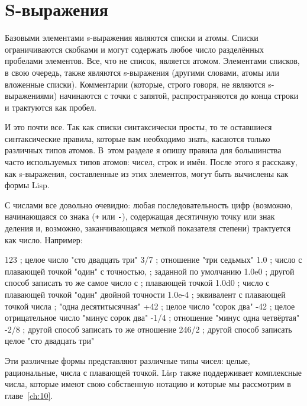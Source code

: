 \section{S-выражения}

Базовыми элементами s-выражения являются списки и атомы. Списки ограничиваются скобками и
могут содержать любое число разделённых пробелами элементов. Все, что не список, является
атомом. Элементами списков, в свою
очередь, также являются s-выражения (другими словами, атомы или вложенные
списки). Комментарии (которые, строго говоря, не являются s-выражениями) начинаются с
точки с запятой, распространяются до конца строки и трактуются как пробел.

И это почти все. Так как списки синтаксически просты, то те оставшиеся синтаксические
правила, которые вам необходимо знать, касаются только различных типов атомов. В~этом
разделе я опишу правила для большинства часто используемых типов атомов: чисел, строк и
имён. После этого я расскажу, как s-выражения, составленные из этих элементов, могут быть
вычислены как формы Lisp.

С числами все довольно очевидно: любая последовательность цифр (возможно, начинающаяся со
знака (\lstinline{+} или \lstinline{-}), содержащая десятичную точку или знак деления и, возможно,
заканчивающаяся меткой показателя степени) трактуется как число. Например:

\begin{myverb}
123       ; целое число "сто двадцать три"
3/7       ; отношение "три седьмых"
1.0       ; число с плавающей точкой "один" с точностью, 
          ; заданной по умолчанию
1.0e0     ; другой способ записать то же самое число с
          ; плавающей точкой
1.0d0     ; число с плавающей точкой "один" двойной точности
1.0e-4    ; эквивалент с плавающей точкой числа
          ; "одна десятитысячная"
+42       ; целое число "сорок два"
-42       ; целое отрицательное число "минус сорок два"
-1/4      ; отношение "минус одна четвёртая"
-2/8      ; другой способ записать то же отношение
246/2     ; другой способ записать целое "сто двадцать три"
\end{myverb}

Эти различные формы представляют различные типы чисел: целые, рациональные, числа с
плавающей точкой. Lisp также поддерживает комплексные числа, которые имеют свою
собственную нотацию и которые мы рассмотрим в главе~\ref{ch:10}.


